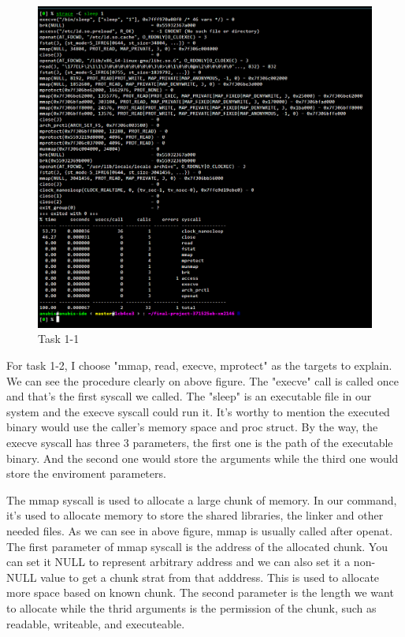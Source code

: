 \documentclass[11pt,oneside,a4paper]{article}
\begin{document}
\begin{figure}[H]
    \includegraphics[width=4.75in]{1-3.png}
    \centering
    \caption{Task 1-1}
\end{figure}

For task 1-2, I choose "mmap, read, execve, mprotect" as the targets to explain. We can
see the procedure clearly on above figure. The "execve" call is called once and 
that's the first syscall we called. The "sleep" is an executable file in our system
and the execve syscall could run it. It's worthy to mention the executed binary would 
use the caller's memory space and proc struct. By the way, the execve syscall has three
3 parameters, the first one is the path of the executable binary. And the second one
would store the arguments while the third one would store the enviroment parameters.


The mmap syscall is used to allocate a large chunk of memory. In our command, 
it's used to allocate memory to store the shared libraries, the linker and other 
needed files. As we can see in above figure, mmap is usually called after openat.
The first parameter of mmap syscall is the address of the allocated chunk. You can 
set it NULL to represent arbitrary address and we can also set it a non-NULL value
to get a chunk strat from that adddress. This is used to allocate more space based 
on known chunk. The second parameter is the length we want to allocate while the thrid
arguments is the permission of the chunk, such as readable, writeable, and executeable.
\end{document}
